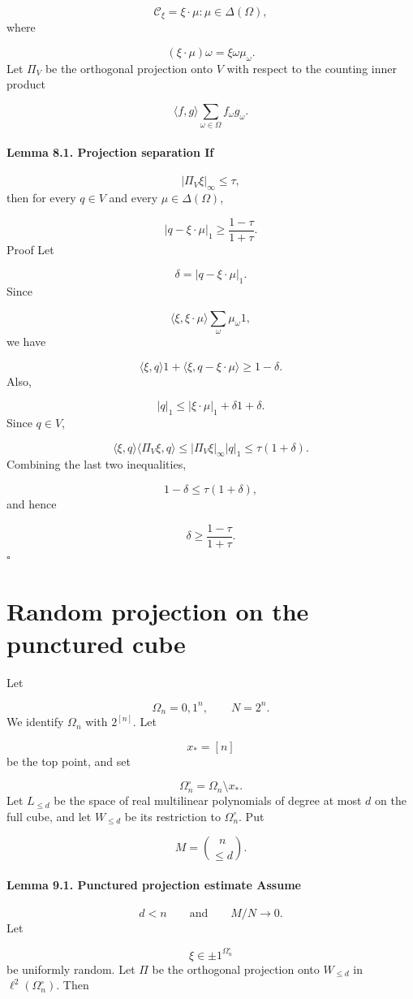 \documentclass[11pt]{article}
\theoremstyle{definition}
\begin{document}
\[
\mathcal C_\xi=
{\xi\cdot\mu:\mu\in\Delta(\Omega)},
\]
where

\[
(\xi\cdot\mu)\omega=\xi\omega\mu_\omega.
\]
Let $\Pi_V$ be the orthogonal projection onto $V$ with respect to the counting inner product

\[
\langle f,g\rangle
\sum_{\omega\in\Omega}f_\omega g_\omega.
\]
\paragraph{Lemma 8.1. Projection separation If}
\[
|\Pi_V\xi|_\infty\le\tau,
\]
then for every $q\in V$ and every $\mu\in\Delta(\Omega)$,

\[
|q-\xi\cdot\mu|_1
\ge
\frac{1-\tau}{1+\tau}.
\]
Proof Let

\[
\delta=|q-\xi\cdot\mu|_1.
\]
Since

\[
\langle \xi,\xi\cdot\mu\rangle
\sum_{\omega}\mu_\omega
1,
\]
we have

\[
\langle \xi,q\rangle
1+\langle \xi,q-\xi\cdot\mu\rangle
\ge
1-\delta.
\]
Also,

\[
|q|_1
\le
|\xi\cdot\mu|_1+\delta
1+\delta.
\]
Since $q\in V$,

\[
\langle \xi,q\rangle
\langle \Pi_V\xi,q\rangle
\le
|\Pi_V\xi|_\infty|q|_1
\le
\tau(1+\delta).
\]
Combining the last two inequalities,

\[
1-\delta\le \tau(1+\delta),
\]
and hence

\[
\delta\ge \frac{1-\tau}{1+\tau}.
\]
\(\square\)
\section{Random projection on the punctured cube}
Let

\[
\Omega_n={0,1}^n,
\qquad
N=2^n.
\]
We identify $\Omega_n$ with $2^{[n]}$. Let

\[
x_*=[n]
\]
be the top point, and set

\[
\Omega_n^\circ=\Omega_n\setminus{x_*}.
\]
Let $L_{\le d}$ be the space of real multilinear polynomials of degree at most $d$ on the full cube, and let $W_{\le d}$ be its restriction to $\Omega_n^\circ$. Put

\[
M=\binom{n}{\le d}.
\]
\paragraph{Lemma 9.1. Punctured projection estimate Assume}
\[
d<n
\qquad\text{and}\qquad
M/N\to0.
\]
Let

\[
\xi\in{\pm1}^{\Omega_n^\circ}
\]
be uniformly random. Let $\Pi$ be the orthogonal projection onto $W_{\le d}$ in $\ell^2(\Omega_n^\circ)$. Then
\end{document}
